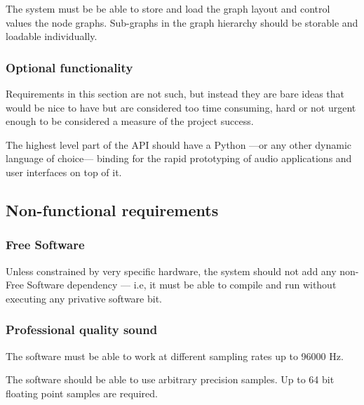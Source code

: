 \begin{requirement}
\label{req:persistence}
The system must be be able to store and load the graph layout and
control values the node graphs. Sub-graphs in the graph hierarchy
should be storable and loadable individually.
\end{requirement}

\subsubsection{Optional functionality}

Requirements in this section are not such, but instead they are bare
ideas that would be nice to have but are considered too time
consuming, hard or not urgent enough to be considered a measure of the
project success.

\begin{requirement}
The highest level part of the API should have a Python ---or any other
dynamic language of choice--- binding for the rapid prototyping of
audio applications and user interfaces on top of it.
\end{requirement}

\subsection{Non-functional requirements}

\subsubsection{Free Software}

\begin{requirement}\label{req:free}
Unless constrained by very specific hardware, the system should not
add any non-Free Software dependency --- i.e, it must be able to
compile and run without executing any privative software bit. 
\end{requirement}

\subsubsection{Professional quality sound}

\begin{requirement}
\label{req:iter1-begin2}
The software must be able to work at different sampling rates up to
96000 Hz.
\end{requirement}

\begin{requirement}
\label{req:iter1-end2}
The software should be able to use arbitrary precision samples. Up to
64 bit floating point samples are required.
\end{requirement}

